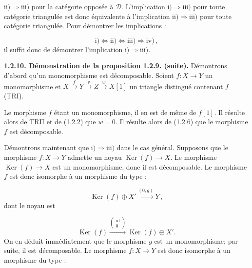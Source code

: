 \clearpage
{}%
\begingroup
\small
\setlength{\abovedisplayskip}{4pt plus 2pt minus 2pt}%
\setlength{\belowdisplayskip}{4pt plus 2pt minus 2pt}%

$\mathrm{ii)}\Longrightarrow\mathrm{iii)}$ pour la catégorie opposée à
$\mathcal D$. L'implication $\mathrm{i)}\Longrightarrow\mathrm{iii)}$ pour
toute catégorie triangulée est donc équivalente à l'implication
$\mathrm{ii)}\Longrightarrow\mathrm{iii)}$ pour toute catégorie triangulée.
Pour démontrer les implications :

\[
  \mathrm{i)}\Longleftrightarrow\mathrm{ii)}
  \Longleftrightarrow\mathrm{iii)}\Longrightarrow\mathrm{iv)}\,,
\]
il suffit donc de démontrer l'implication
$\mathrm{i)}\Longrightarrow\mathrm{iii)}$.

\medskip
\noindent\textbf{1.2.10. Démonstration de la proposition 1.2.9. (suite).}
Démontrons d'abord qu'un monomorphisme est décomposable. Soient
$f\colon X\longrightarrow Y$ un monomorphisme et
$X\xrightarrow{f}Y\xrightarrow{v}Z\xrightarrow{w}X[1]$ un triangle
distingué contenant $f$ (TRI).

Le morphisme $f$ étant un monomorphisme, il en est de même de $f[1]$. Il
résulte alors de TRII et de (1.2.2) que $w=0$. Il résulte alors de (1.2.6)
que le morphisme $f$ est décomposable.

Démontrons maintenant que
$\mathrm{i)}\Longrightarrow\mathrm{iii)}$ dans le cas général. Supposons
que le morphisme $f\colon X\longrightarrow Y$ admette un noyau
$\operatorname{Ker}(f)\longrightarrow X$. Le morphisme
$\operatorname{Ker}(f)\longrightarrow X$ est un monomorphisme, donc il est
décomposable. Le morphisme $f$ est donc isomorphe à un morphisme du type :

\[
  \operatorname{Ker}(f)\oplus X'
  \xrightarrow{(0,g)}Y\,,
\]
dont le noyau est

\[
  \operatorname{Ker}(f)
  \xrightarrow{\left(\begin{smallmatrix}\operatorname{id}\\0\end{smallmatrix}\right)}
  \operatorname{Ker}(f)\oplus X'.
\]
On en déduit immédiatement que le morphisme $g$ est un monomorphisme; par
suite, il est décomposable. Le morphisme $f\colon X\longrightarrow Y$ est
donc isomorphe à un morphisme du type :

